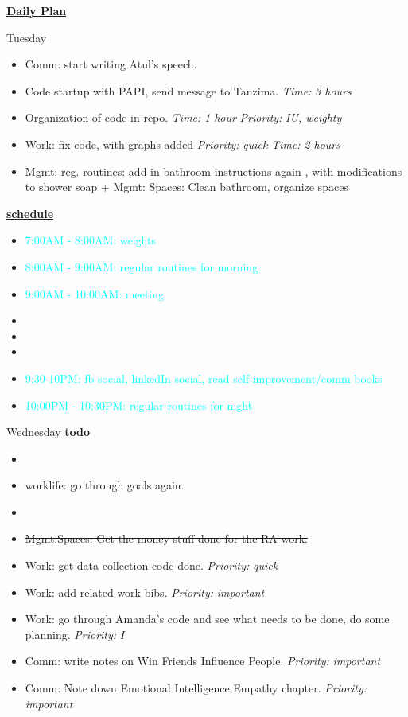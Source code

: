 \documentclass[serif,mathserif,final]{beamer}
\newcommand{\doneTask}[1]{\item \sout{#1}}
\newcommand{\timeEst}[1]{\textit{Time:} \textit{#1}}
\newcommand{\priority}[1]{\textit{Priority:} \textit{#1}}
\newcommand{\regItem}[1]{\item \textcolor{cyan}{#1}}
\begin{document}
\begin{frame}{}
\begin{columns}[t]
\begin{column}{0.33\linewidth}{\textbf{\underline{Daily Plan}}}
{\begin{block}{\small Tuesday}
\begin{itemize}
\item \tiny Comm: start writing Atul's speech. 

  \item \tiny Code startup with PAPI, send message to Tanzima. \timeEst{3 hours} 
  \item \tiny Organization of code in repo. \timeEst{1 hour} \priority{IU, weighty} 
  \item \tiny Work: fix code, with graphs added \priority{quick} \timeEst{2 hours} 

  \item \tiny Mgmt: reg. routines: add in bathroom instructions again , with modifications to shower soap +  Mgmt: Spaces: Clean bathroom, organize spaces 
  \end{itemize} 
  
\underline{\textbf{schedule}}\\
\begin{itemize}
\regItem{7:00AM - 8:00AM: weights}
\regItem{8:00AM - 9:00AM: regular routines for morning}
\regItem{9:00AM - 10:00AM: meeting} 
\item \tiny 
\item \tiny 
\item \tiny 
\regItem{9:30-10PM: fb social, linkedIn social, read self-improvement/comm books}
\regItem{10:00PM - 10:30PM: regular routines for night} 
\end{itemize} 
\end{block} 

\begin{block} {\small Wednesday}
\textbf{todo} \\
  \begin{itemize} 
  \item \doneTask{\tiny worklife: go through goals again.}
  \item \doneTask{\tiny  Mgmt:Spaces:  Get the money stuff done for the RA work.} 
    
    
  \item \tiny Work: get data collection code done. \priority{quick} 
  \item \tiny Work: add related work bibs.  \priority{important} 
  \item \tiny Work: go through Amanda's code and see what needs to be done, do some planning. \priority{I} 

  \item \tiny Comm: write notes on Win Friends Influence People. \priority{important} 
  \item \tiny Comm: Note down Emotional Intelligence Empathy chapter. \priority{important} 


\end{itemize}
\end{block}}
\end{column}
\end{columns}
\end{frame}
\end{document}
